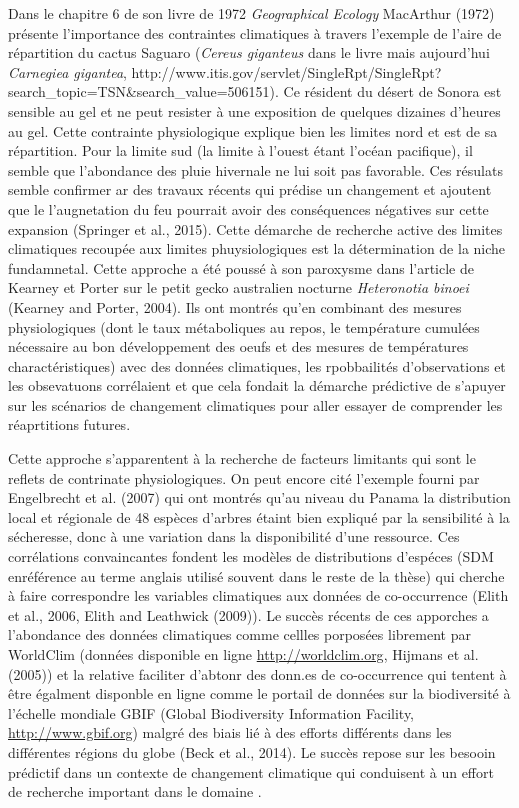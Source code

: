 Dans le chapitre 6 de son livre de 1972 \emph{Geographical Ecology}
MacArthur (1972) présente l'importance des contraintes climatiques à
travers l'exemple de l'aire de répartition du cactus Saguaro
(\emph{Cereus giganteus} dans le livre mais aujourd'hui \emph{Carnegiea
gigantea},
http://www.itis.gov/servlet/SingleRpt/SingleRpt?search\_topic=TSN\&search\_value=506151).
Ce résident du désert de Sonora est sensible au gel et ne peut resister
à une exposition de quelques dizaines d'heures au gel. Cette contrainte
physiologique explique bien les limites nord et est de sa répartition.
Pour la limite sud (la limite à l'ouest étant l'océan pacifique), il
semble que l'abondance des pluie hivernale ne lui soit pas favorable.
Ces résulats semble confirmer ar des travaux récents qui prédise un
changement et ajoutent que le l'augnetation du feu pourrait avoir des
conséquences négatives sur cette expansion (Springer et al., 2015).
Cette démarche de recherche active des limites climatiques recoupée aux
limites phuysiologiques est la détermination de la niche fundamnetal.
Cette approche a été poussé à son paroxysme dans l'article de Kearney et
Porter sur le petit gecko australien nocturne \emph{Heteronotia binoei}
(Kearney and Porter, 2004). Ils ont montrés qu'en combinant des mesures
physiologiques (dont le taux métaboliques au repos, le température
cumulées nécessaire au bon développement des oeufs et des mesures de
températures charactéristiques) avec des données climatiques, les
rpobbailités d'observations et les obsevatuons corrélaient et que cela
fondait la démarche prédictive de s'apuyer sur les scénarios de
changement climatiques pour aller essayer de comprender les réaprtitions
futures.

Cette approche s'apparentent à la recherche de facteurs limitants qui
sont le reflets de contrinate physiologiques. On peut encore cité
l'exemple fourni par Engelbrecht et al. (2007) qui ont montrés qu'au
niveau du Panama la distribution local et régionale de 48 espèces
d'arbres étaint bien expliqué par la sensibilité à la sécheresse, donc à
une variation dans la disponibilité d'une ressource. Ces corrélations
convaincantes fondent les modèles de distributions d'espéces (SDM
enréférence au terme anglais utilisé souvent dans le reste de la thèse)
qui cherche à faire correspondre les variables climatiques aux données
de co-occurrence (Elith et al., 2006, Elith and Leathwick (2009)). Le
succès récents de ces apporches a l'abondance des données climatiques
comme cellles porposées librement par WorldClim (données disponible en
ligne \url{http://worldclim.org}, Hijmans et al. (2005)) et la relative
faciliter d'abtonr des donn.es de co-occurrence qui tentent à être
égalment disponble en ligne comme le portail de données sur la
biodiversité à l'échelle mondiale GBIF (Global Biodiversity Information
Facility, \url{http://www.gbif.org}) malgré des biais lié à des efforts
différents dans les différentes régions du globe (Beck et al., 2014). Le
succès repose sur les besooin prédictif dans un contexte de changement
climatique qui conduisent à un effort de recherche important dans le
domaine \cite{Thomas2004,Thuiller2011}.

